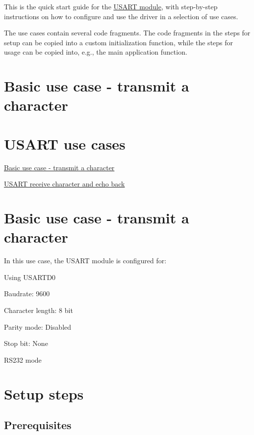 This is the quick start guide for the \hyperlink{group__usart__group}{U\-S\-A\-R\-T module}, with step-\/by-\/step instructions on how to configure and use the driver in a selection of use cases.

The use cases contain several code fragments. The code fragments in the steps for setup can be copied into a custom initialization function, while the steps for usage can be copied into, e.\-g., the main application function.\hypertarget{xmega_usart_quickstart_usart_basic_use_case}{}\section{Basic use case -\/ transmit a character}\label{xmega_usart_quickstart_usart_basic_use_case}
\hypertarget{xmega_usart_quickstart_usart_use_cases}{}\section{U\-S\-A\-R\-T use cases}\label{xmega_usart_quickstart_usart_use_cases}

\begin{DoxyItemize}
\item \hyperlink{xmega_usart_quickstart_usart_basic_use_case}{Basic use case -\/ transmit a character}
\item \hyperlink{usart_use_case_1}{U\-S\-A\-R\-T receive character and echo back}
\end{DoxyItemize}\hypertarget{xmega_usart_quickstart_usart_basic_use_case}{}\section{Basic use case -\/ transmit a character}\label{xmega_usart_quickstart_usart_basic_use_case}
In this use case, the U\-S\-A\-R\-T module is configured for\-:
\begin{DoxyItemize}
\item Using U\-S\-A\-R\-T\-D0
\item Baudrate\-: 9600
\item Character length\-: 8 bit
\item Parity mode\-: Disabled
\item Stop bit\-: None
\item R\-S232 mode
\end{DoxyItemize}\hypertarget{xmega_usart_quickstart_usart_basic_use_case_setup}{}\section{Setup steps}\label{xmega_usart_quickstart_usart_basic_use_case_setup}
\hypertarget{xmega_usart_quickstart_usart_basic_use_case_setup_prereq}{}\subsection{Prerequisites}\label{xmega_usart_quickstart_usart_basic_use_case_setup_prereq}


